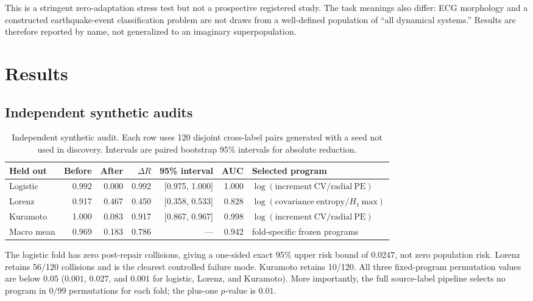 \documentclass[10pt]{article}
\theoremstyle{definition}
\theoremstyle{remark}
\begin{document}
This is a stringent zero-adaptation stress test but not a prospective registered study. The task meanings also differ: ECG morphology and a constructed earthquake-event classification problem are not draws from a well-defined population of ``all dynamical systems.'' Results are therefore reported by name, not generalized to an imaginary superpopulation.

\section{Results}
\label{sec:results}

\subsection{Independent synthetic audits}

\begin{table}[H]
\centering
\caption{Independent synthetic audit. Each row uses 120 disjoint cross-label pairs generated with a seed not used in discovery. Intervals are paired bootstrap 95\% intervals for absolute reduction.}
\label{tab:synthetic}
\small
\begin{tabularx}{\linewidth}{@{}lrrrrrX@{}}
\toprule
Held out & Before & After & $\Delta R$ & 95\% interval & AUC & Selected program\\
\midrule
Logistic & 0.992 & 0.000 & 0.992 & [0.975, 1.000] & 1.000 & $\log(\mathrm{increment\ CV}/\mathrm{radial\ PE})$\\
Lorenz & 0.917 & 0.467 & 0.450 & [0.358, 0.533] & 0.828 & $\log(\mathrm{covariance\ entropy}/H_1\mathrm{\ max})$\\
Kuramoto & 1.000 & 0.083 & 0.917 & [0.867, 0.967] & 0.998 & $\log(\mathrm{increment\ CV}/\mathrm{radial\ PE})$\\
\midrule
Macro mean & 0.969 & 0.183 & 0.786 & --- & 0.942 & fold-specific frozen programs\\
\bottomrule
\end{tabularx}
\end{table}

The logistic fold has zero post-repair collisions, giving a one-sided exact 95\% upper risk bound of $0.0247$, not zero population risk. Lorenz retains 56/120 collisions and is the clearest controlled failure mode. Kuramoto retains 10/120. All three fixed-program permutation values are below $0.05$ ($0.001$, $0.027$, and $0.001$ for logistic, Lorenz, and Kuramoto). More importantly, the full source-label pipeline selects no program in $0/99$ permutations for each fold; the plus-one $p$-value is $0.01$.
\end{document}
